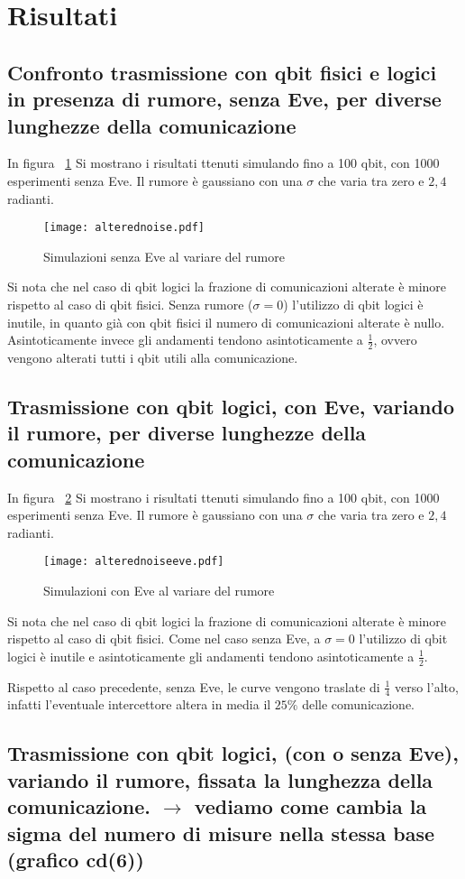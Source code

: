\documentclass[11 pt, a4paper]{article}
\begin{document}
\clearpage
\section{Risultati}
\subsection{Confronto trasmissione con qbit fisici e logici in presenza di rumore, senza Eve, per diverse lunghezze della comunicazione}

In figura ~\ref{fig:alteredvsnoise} Si mostrano i risultati ttenuti simulando fino a 100 qbit, con 1000 esperimenti senza Eve.
Il rumore è gaussiano con una $\sigma$ che varia tra zero e $2,4$ radianti.

\begin{figure}[htb!]
\centering
\texttt{[image: alterednoise.pdf]}
\caption{Simulazioni senza Eve al variare del rumore}
\label{fig:alteredvsnoise}
\end{figure}

Si nota che nel caso di qbit logici la frazione di comunicazioni alterate è minore rispetto al caso di qbit fisici.
Senza rumore ($\sigma=0$) l'utilizzo di qbit logici è inutile, in quanto già con qbit fisici il numero di comunicazioni alterate è nullo.
Asintoticamente invece gli andamenti tendono asintoticamente a $\frac{1}{2}$, ovvero vengono alterati tutti i qbit utili alla comunicazione.

\subsection{Trasmissione con qbit logici, con Eve, variando il rumore, per diverse lunghezze della comunicazione}

In figura ~\ref{fig:alteredvsnoiseeve} Si mostrano i risultati ttenuti simulando fino a 100 qbit, con 1000 esperimenti senza Eve.
Il rumore è gaussiano con una $\sigma$ che varia tra zero e $2,4$ radianti.

\begin{figure}[htb!]
\centering
\texttt{[image: alterednoiseeve.pdf]}
\caption{Simulazioni con Eve al variare del rumore}
\label{fig:alteredvsnoiseeve}
\end{figure}

Si nota che nel caso di qbit logici la frazione di comunicazioni alterate è minore rispetto al caso di qbit fisici.
Come nel caso senza Eve, a $\sigma=0$ l'utilizzo di qbit logici è inutile e asintoticamente gli andamenti tendono asintoticamente a $\frac{1}{2}$.

Rispetto al caso precedente, senza Eve, le curve vengono traslate di $\frac{1}{4}$ verso l'alto, infatti l'eventuale intercettore altera in media il $25\%$ delle comunicazione.

\subsection{Trasmissione con qbit logici, (con o senza Eve), variando il rumore, fissata la lunghezza della comunicazione. $\to$ vediamo come cambia la sigma del numero di misure nella stessa base (grafico cd(6))}
\end{document}
